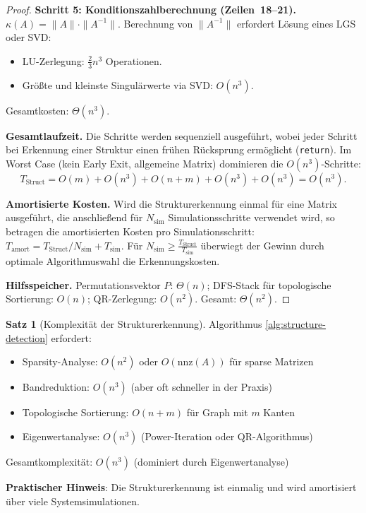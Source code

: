 \documentclass[a4paper,12pt]{report}
\theoremstyle{definition}
\newtheorem{satz}{Satz}
\begin{document}
\begin{proof}
		\textbf{Schritt 5: Konditionszahlberechnung (Zeilen~18--21).}
		$\kappa(A) = \|A\| \cdot \|A^{-1}\|$. Berechnung von $\|A^{-1}\|$ erfordert Lösung eines LGS oder SVD:
		\begin{itemize}
			\item LU-Zerlegung: $\frac{2}{3}n^3$ Operationen.
			\item Größte und kleinste Singulärwerte via SVD: $O(n^3)$.
		\end{itemize}
		Gesamtkosten: $\Theta(n^3)$.

		\textbf{Gesamtlaufzeit.} Die Schritte werden sequenziell ausgeführt, wobei jeder Schritt bei Erkennung einer Struktur einen frühen Rücksprung ermöglicht (\texttt{return}). Im Worst Case (kein Early Exit, allgemeine Matrix) dominieren die $O(n^3)$-Schritte:
		\[
			T_{\mathrm{Struct}} = O(m) + O(n^3) + O(n + m) + O(n^3) + O(n^3) = O(n^3).
		\]

		\textbf{Amortisierte Kosten.} Wird die Strukturerkennung einmal für eine Matrix ausgeführt, die anschließend für $N_{\mathrm{sim}}$ Simulationsschritte verwendet wird, so betra\-gen die amortisierten Kosten pro Simulationsschritt:
		$T_{\mathrm{amort}} = T_{\mathrm{Struct}} / N_{\mathrm{sim}} + T_{\mathrm{sim}}$.
		Für $N_{\mathrm{sim}} \geq \frac{T_{\mathrm{Struct}}}{T_{\mathrm{sim}}}$ überwiegt der Gewinn durch optimale Algorithmuswahl die Erkennungskosten.

		\textbf{Hilfsspeicher.} Permutationsvektor $P$: $\Theta(n)$; DFS-Stack für topologische Sortierung: $O(n)$; QR-Zerlegung: $O(n^2)$. Gesamt: $\Theta(n^2)$.
	\end{proof}

	\begin{satz}[Komplexität der Strukturerkennung]
		Algorithmus \ref{alg:structure-detection} erfordert:
		\begin{itemize}
			\item Sparsity-Analyse: $O(n^2)$ oder $O(\text{nnz}(A))$ für sparse Matrizen
			\item Bandreduktion: $O(n^3)$ (aber oft schneller in der Praxis)
			\item Topologische Sortierung: $O(n + m)$ für Graph mit $m$ Kanten
			\item Eigenwertanalyse: $O(n^3)$ (Power-Iteration oder QR-Algorithmus)
		\end{itemize}
		
		Gesamtkomplexität: $O(n^3)$ (dominiert durch Eigenwertanalyse)
		
		\textbf{Praktischer Hinweis}: Die Strukturerkennung ist einmalig und wird amortisiert über viele Systemsimulationen.
	\end{satz}
	
\end{document}

